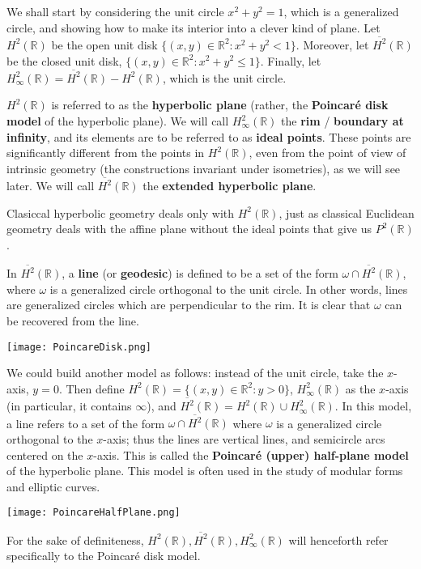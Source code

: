 \documentclass[leqno]{book}
\begin{document}
We shall start by considering the unit circle $x^2+y^2=1$, which is a generalized circle, and showing how to make its interior into a clever kind of plane.  Let $H^2(\mathbb R)$ be the open unit disk $\{(x,y)\in\mathbb R^2:x^2+y^2<1\}$.  Moreover, let $\overline{H^2}(\mathbb R)$ be the closed unit disk, $\{(x,y)\in\mathbb R^2:x^2+y^2\leqslant 1\}$.  Finally, let $H^2_\infty(\mathbb R)=\overline{H^2}(\mathbb R)-H^2(\mathbb R)$, which is the unit circle.

$H^2(\mathbb R)$ is referred to as the \textbf{hyperbolic plane} (rather, the \textbf{Poincar\'e disk model} of the hyperbolic plane).  We will call $H^2_\infty(\mathbb R)$ the \textbf{rim} / \textbf{boundary at infinity}, and its elements are to be referred to as \textbf{ideal points}.  These points are significantly different from the points in $H^2(\mathbb R)$, even from the point of view of intrinsic geometry (the constructions invariant under isometries), as we will see later.  We will call $\overline{H^2}(\mathbb R)$ the \textbf{extended hyperbolic plane}.

Clasiccal hyperbolic geometry deals only with $H^2(\mathbb R)$, just as classical Euclidean geometry deals with the affine plane without the ideal points that give us $P^2(\mathbb R)$.

In $\overline{H^2}(\mathbb R)$, a \textbf{line} (or \textbf{geodesic}) is defined to be a set of the form $\omega\cap\overline{H^2}(\mathbb R)$, where $\omega$ is a generalized circle orthogonal to the unit circle.  In other words, lines are generalized circles which are perpendicular to the rim.  It is clear that $\omega$ can be recovered from the line.
\begin{center}\texttt{[image: PoincareDisk.png]}\end{center}

We could build another model as follows: instead of the unit circle, take the $x$-axis, $y=0$.  Then define $H^2(\mathbb R)=\{(x,y)\in\mathbb R^2:y>0\}$, $H^2_\infty(\mathbb R)$ as the $x$-axis (in particular, it contains $\infty$), and $\overline{H^2}(\mathbb R)=H^2(\mathbb R)\cup H^2_\infty(\mathbb R)$.  In this model, a line refers to a set of the form $\omega\cap\overline{H^2}(\mathbb R)$ where $\omega$ is a generalized circle orthogonal to the $x$-axis; thus the lines are vertical lines, and semicircle arcs centered on the $x$-axis.  This is called the \textbf{Poincar\'e (upper) half-plane model} of the hyperbolic plane.  This model is often used in the study of modular forms and elliptic curves.
\begin{center}\texttt{[image: PoincareHalfPlane.png]}\end{center}
For the sake of definiteness, $H^2(\mathbb R),\overline{H^2}(\mathbb R),H^2_\infty(\mathbb R)$ will henceforth refer specifically to the Poincar\'e disk model.
\end{document}
